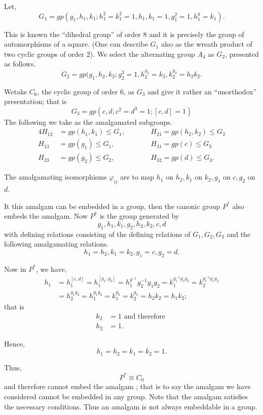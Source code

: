 Let, 
$$
G_1 = gp(g_1, h_1, k_1 ; h^2_1 = k^2_1=1, h_1, k_1 =1,  g^2_1 =
1,h^g_1 =k_1). 
$$

This is known the ``dihedral group'' of order 8 and it is precisely
the group of automorphisms of a square. (One can describe $G_1$ also
as the wreath product of two cyclic groups of order 2). We select the
alternating group $A_4$ as $G_2$, presented as follows. 
$$
G_2 = gp(g_1, h_2, k_2; g^3_2 =1,  h^{g_2}_2 = k_2, k^{g_2}_2 = h_2 k_2.
$$

We\pageoriginale take $C_6$, the cyclic group of order $6$, as $G_3$ and give it
rather an ``unorthodox'' presentation; that is  
$$
G_3 = gp( c,d; c^2 = d^3 = 1; [c, d ] =1)
$$
The following we take as the amalgamated subgroups.
\begin{alignat*}{4}
  H_{12}& = gp(h_1, k_1) \leq G_1,&\qquad & H_{21} = gp(h_2, k_2) \leq G_2\\
  H_{13} & = gp(g_1) \leq G_1,  && H_{31} = gp(c) \leq G_3\\
  H_{23} & = gp(g_2) \leq G_2,  && H_{32} = gp(d) \leq G_3.
\end{alignat*} 

The amalgamating isomorphisms $\varphi_{ij}$ are to map $h_1$ on $h_2,
k_1$ on $k_2, g_1$ on $c, g_2$ on $d$. 

It this amalgam can be embedded in a group, then the canonic group
$P^*$ also embeds the amalgam. Now $P^*$ is the group generated by  
$$
g_1, h_1, k_1, g_2, h_2, k_2, c, d
$$
with defining relations consisting of the defining relations of $G_1,
G_2, G_3$ and the following amalgamating relations. 
$$
h_1 = h_2, k_1= k_2, g_1=c, g_2=d.
$$

Now in $P^*$, we have,
\begin{align*}
  h_1 & = h^{[c, d]}_1 = h^{[g_1, g_2]}_1= h^{g^{-1}}_1 g^{-1}_2 g_1
  g_2 = k^{g^{-1}_1 g_1 g_2}_1 = k^{g^{-1}_1 g_1 g_2}_2\\ 
  & = h^{g_1 g_2}_2 = h^{g_1 g_2}_1 = k^{ g_2}_1 = k^{ g_2}_2 = h_2 k_2 = h_1 k_2 ; 
\end{align*}
that is\pageoriginale 
\begin{align*}
  k_2& = 1 \text{ and therefore }\\
  h_2 & = 1.
\end{align*}

Hence,
$$
h_1 = h_2 = k_1 = k_2 =1.
$$

Thus,
$$
P^* \cong C_0
$$
and therefore cannot embed the amalgam ; that is to say the amalgam we
have considered cannot be embedded in any group. Note that the amalgam
satisfies the necessary conditions. Thus an amalgam is not always
embeddable in a group.  

